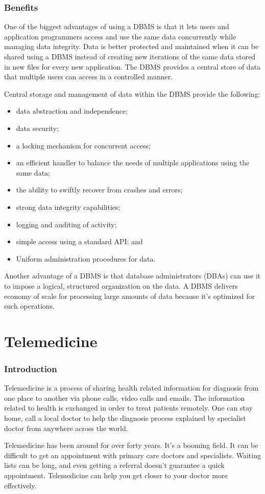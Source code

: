 \documentclass[11pt,a4paper,twoside]{article}
\begin{document}
\section{Benefits}
One of the biggest advantages of using a DBMS is that it lets users and application programmers access and use the same data concurrently while managing data integrity. Data is better protected and maintained when it can be shared using a DBMS instead of creating new iterations of the same data stored in new files for every new application. The DBMS provides a central store of data that multiple users can access in a controlled manner.\par
Central storage and management of data within the DBMS provide the following:
\begin{itemize}
\item data abstraction and independence;
\item data security;
\item a locking mechanism for concurrent access;
\item an efficient handler to balance the needs of multiple applications using the same data;
\item the ability to swiftly recover from crashes and errors;
\item strong data integrity capabilities;
\item logging and auditing of activity;
\item simple access using a standard API; and
\item Uniform administration procedures for data.
\end{itemize}
Another advantage of a DBMS is that database administrators (DBAs) can use it to impose a logical, structured organization on the data. A DBMS delivers economy of scale for processing large amounts of data because it's optimized for such operations.
\newpage
\part{Telemedicine}
\section{Introduction}
Telemedicine is a process of sharing health related information for diagnosis from one place to another via phone calls, video calls and emails. The information related to health is exchanged in order to treat patients remotely. One can stay home, call a local doctor to help the diagnosis process explained by specialist doctor from anywhere across the world.\par
Telemedicine has been around for over forty years. It's a booming field. It can be difficult to get an appointment with primary care doctors and specialists. Waiting lists can be long, and even getting a referral doesn't guarantee a quick appointment. Telemedicine can help you get closer to your doctor more effectively.
\end{document}
